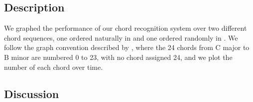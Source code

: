 \documentclass[journal]{IEEEtran}
\begin{document}
\subsection{Description}
We graphed the performance of our chord recognition system over two different chord sequences, one ordered naturally in  and one ordered randomly in .
We follow the graph convention described by \cite{harte}, where the 24 chords from C major to B minor are numbered 0 to 23, with no chord assigned 24, and we plot the number of each chord over time.

\subsection{Discussion}



\end{document}
